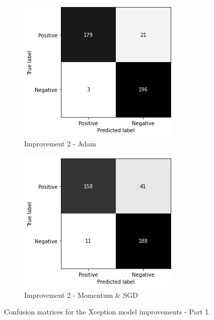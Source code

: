\begin{figure}
    \begin{subfigure}[b]{0.49\textwidth}
        \centering
        \includegraphics[width=\textwidth]{figures/cm-improv-2.png}
        \caption{Improvement 2 - Adam}
        \label{fig:cm-improv-2}
    \end{subfigure}
    \hfill
    \begin{subfigure}[b]{0.49\textwidth}
        \centering
        \includegraphics[width=\textwidth]{figures/cm-improv-2-sgd.png}
        \caption{Improvement 2 - Momentum \& SGD}
        \label{fig:cm-improv-2-sgd}
    \end{subfigure}
    \caption{Confusion matrices for the Xception model improvements - Part 1.}
    \label{fig:cm-improv-p1}
\end{figure}
